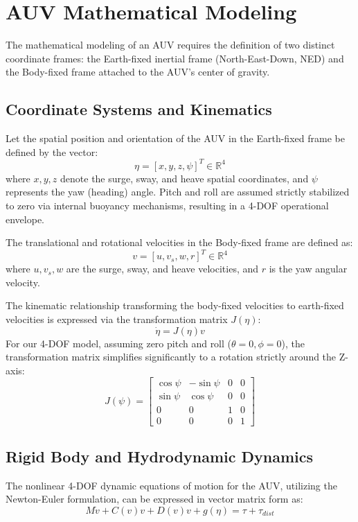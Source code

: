 \documentclass[conference]{IEEEtran}
\begin{document}
\section{AUV Mathematical Modeling}
The mathematical modeling of an AUV requires the definition of two distinct coordinate frames: the Earth-fixed inertial frame (North-East-Down, NED) and the Body-fixed frame attached to the AUV's center of gravity.

\subsection{Coordinate Systems and Kinematics}
Let the spatial position and orientation of the AUV in the Earth-fixed frame be defined by the vector:
\begin{equation}
\eta = [x, y, z, \psi]^T \in \mathbb{R}^4
\end{equation}
where $x, y, z$ denote the surge, sway, and heave spatial coordinates, and $\psi$ represents the yaw (heading) angle. Pitch and roll are assumed strictly stabilized to zero via internal buoyancy mechanisms, resulting in a 4-DOF operational envelope.

The translational and rotational velocities in the Body-fixed frame are defined as:
\begin{equation}
v = [u, v_s, w, r]^T \in \mathbb{R}^4
\end{equation}
where $u, v_s, w$ are the surge, sway, and heave velocities, and $r$ is the yaw angular velocity. 

The kinematic relationship transforming the body-fixed velocities to earth-fixed velocities is expressed via the transformation matrix $J(\eta)$:
\begin{equation}
\dot{\eta} = J(\eta) v
\end{equation}
For our 4-DOF model, assuming zero pitch and roll ($\theta = 0, \phi = 0$), the transformation matrix simplifies significantly to a rotation strictly around the Z-axis:
\begin{equation}
J(\psi) = 
\begin{bmatrix}
\cos\psi & -\sin\psi & 0 & 0 \\
\sin\psi & \cos\psi & 0 & 0 \\
0 & 0 & 1 & 0 \\
0 & 0 & 0 & 1
\end{bmatrix}
\end{equation}

\subsection{Rigid Body and Hydrodynamic Dynamics}
The nonlinear 4-DOF dynamic equations of motion for the AUV, utilizing the Newton-Euler formulation, can be expressed in vector matrix form as:
\begin{equation}
M \dot{v} + C(v)v + D(v)v + g(\eta) = \tau + \tau_{dist}
\end{equation}
\end{document}

